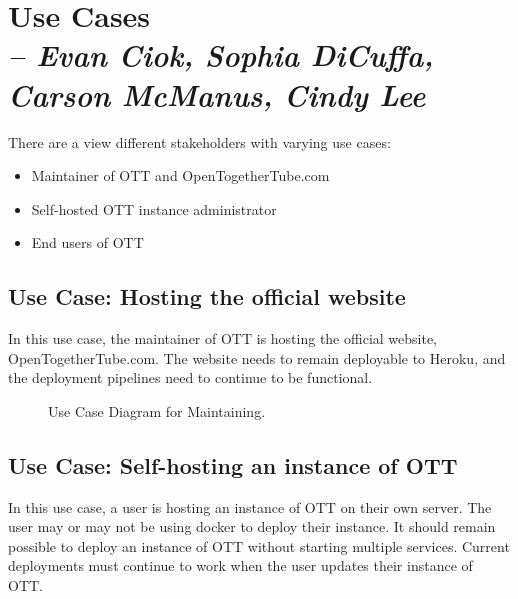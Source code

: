 \chapter{Use Cases \\
  \small{\textit{-- Evan Ciok, Sophia DiCuffa, Carson McManus, Cindy Lee}}
  \label{Chapter::UseCases}}

There are a view different stakeholders with varying use cases:

\begin{itemize}
	\item Maintainer of OTT and OpenTogetherTube.com
	\item Self-hosted OTT instance administrator
	\item End users of OTT
\end{itemize}

\section{Use Case: Hosting the official website}

In this use case, the maintainer of OTT is hosting the official website, OpenTogetherTube.com. The website needs to remain deployable to Heroku, and the deployment pipelines need to continue to be functional.

\begin{figure}[!htb]
  \centering
  \caption{\label{Figure::gossip-class-diaguse-case-maint} Use Case Diagram for Maintaining.}
\end{figure}


\section{Use Case: Self-hosting an instance of OTT}

In this use case, a user is hosting an instance of OTT on their own server. The user may or may not be using docker to deploy their instance. It should remain possible to deploy an instance of OTT without starting multiple services. Current deployments must continue to work when the user updates their instance of OTT.

